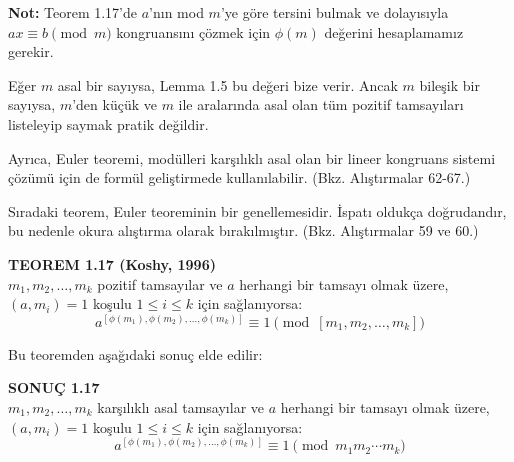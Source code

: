 \documentclass[12pt]{article}
\begin{document}
\vspace{2em}

\begin{tcolorbox}[colback=yellow!5, colframe=orange!60!black, title=\textbf{Euler Teoremi Üzerine Sonuçlar ve Genellemeler}, fonttitle=\bfseries, sharp corners]

\textbf{Not:} Teorem 1.17'de $a$'nın mod $m$'ye göre tersini bulmak ve dolayısıyla $ax \equiv b \pmod{m}$ kongruansını çözmek için $\phi(m)$ değerini hesaplamamız gerekir.

Eğer $m$ asal bir sayıysa, Lemma 1.5 bu değeri bize verir. Ancak $m$ bileşik bir sayıysa, $m$'den küçük ve $m$ ile aralarında asal olan tüm pozitif tamsayıları listeleyip saymak pratik değildir.


Ayrıca, Euler teoremi, modülleri karşılıklı asal olan bir lineer kongruans sistemi çözümü için de formül geliştirmede kullanılabilir. (Bkz. Alıştırmalar 62-67.)

Sıradaki teorem, Euler teoreminin bir genellemesidir. İspatı oldukça doğrudandır, bu nedenle okura alıştırma olarak bırakılmıştır. (Bkz. Alıştırmalar 59 ve 60.)

\begin{center}
\textbf{TEOREM 1.17 (Koshy, 1996)}\\
$m_1, m_2, \ldots, m_k$ pozitif tamsayılar ve $a$ herhangi bir tamsayı olmak üzere, \\
$(a, m_i) = 1$ koşulu $1 \leq i \leq k$ için sağlanıyorsa:
\[
a^{[\phi(m_1), \phi(m_2), \ldots, \phi(m_k)]} \equiv 1 \pmod{[m_1, m_2, \ldots, m_k]}
\]
\end{center}

Bu teoremden aşağıdaki sonuç elde edilir:

\begin{center}
\textbf{SONUÇ 1.17}\\
$m_1, m_2, \ldots, m_k$ karşılıklı asal tamsayılar ve $a$ herhangi bir tamsayı olmak üzere, \\
$(a, m_i) = 1$ koşulu $1 \leq i \leq k$ için sağlanıyorsa:
\[
a^{[\phi(m_1), \phi(m_2), \ldots, \phi(m_k)]} \equiv 1 \pmod{m_1 m_2 \cdots m_k}
\]
\end{center}

\end{tcolorbox}
\end{document}
